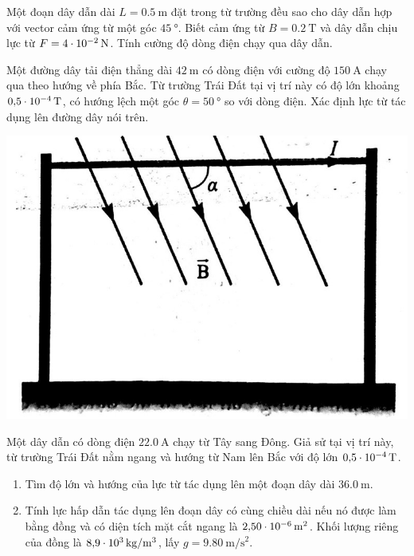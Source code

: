 \begin{ex}
	Một đoạn dây dẫn dài $L=\SI{0.5}{\meter}$ đặt trong từ trường đều sao cho dây dẫn hợp với vector cảm ứng từ một góc $\SI{45}{\degree}$. Biết cảm ứng từ $B=\SI{0.2}{\tesla}$ và dây dẫn chịu lực từ $F=\SI{4E-2}{\newton}$. Tính cường độ dòng điện chạy qua dây dẫn.
\end{ex}
\begin{ex}
	Một đường dây tải điện thẳng dài $\SI{42}{\meter}$ có dòng điện với cường độ $\SI{150}{\ampere}$ chạy qua theo hướng về phía Bắc. Từ trường Trái Đất tại vị trí này có độ lớn khoảng $\SI{0.5E-4}{\tesla}$, có hướng lệch một góc $\theta=\SI{50}{\degree}$ so với dòng điện. Xác định lực từ tác dụng lên đường dây nói trên.
	\begin{center}
		\includegraphics[width=0.4\linewidth]{figs/VN12-Y24-PH-SYL-018P-7}
	\end{center}
\end{ex}
\begin{ex}
	Một dây dẫn có dòng điện $\SI{22.0}{\ampere}$ chạy từ Tây sang Đông. Giả sử tại vị trí này, từ trường Trái Đất nằm ngang và hướng từ Nam lên Bắc với độ lớn $\SI{0.5E-4}{\tesla}$.
	\begin{enumerate}[label=\alph*)]
		\item Tìm độ lớn và hướng của lực từ tác dụng lên một đoạn dây dài $\SI{36.0}{\meter}$.
		\item Tính lực hấp dẫn tác dụng lên đoạn dây có cùng chiều dài nếu nó được làm bằng đồng và có diện tích mặt cắt ngang là $\SI{2.50E-6}{\meter^2}$. Khối lượng riêng của đồng là $\SI{8.9E3}{\kilogram/\meter^3}$, lấy $g=\SI{9.80}{\meter/\second^2}$.
	\end{enumerate}
\end{ex}
